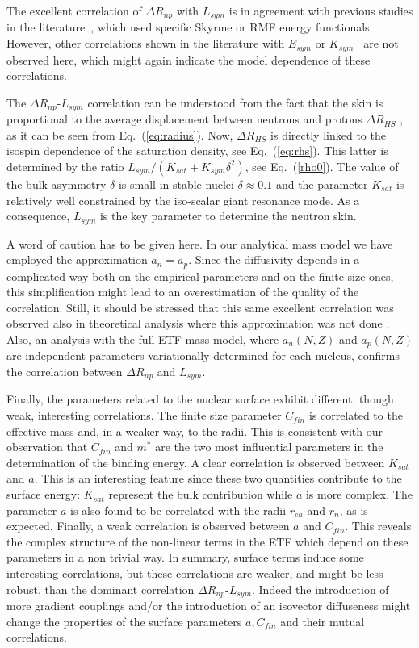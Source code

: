 \documentclass
[aps,prc,twocolumn,showpacs,showkeys,amsmath,floatfix,superscriptaddress]{revtex4}
\begin{document}
{{The excellent correlation of $\Delta R_{np}$ with $L_{sym}$ is in agreement with previous studies in the literature~\cite{Mondal,warda09,centelles10,reinhard16,centelles13}, 
which used specific Skyrme or RMF energy functionals. 
However, other correlations shown in the literature with $E_{sym}$ or $K_{sym}$~\cite{Nazarewicz14,papazoglou} are not observed here, which might again indicate the model dependence of these correlations.

The $\Delta R_{np}$-$L_{sym}$ correlation can be understood from the fact that the skin is proportional to the average displacement between neutrons and protons $\Delta R_{HS}$ \cite{meyers}, as it can be seen from Eq.~(\ref{eq:radius}). 
Now, $\Delta R_{HS}$ is directly linked to the isospin dependence of the saturation density, see Eq.~(\ref{eq:rhs}). 
This latter is determined by the ratio $L_{sym}/(K_{sat} + K_{sym}\delta^2)$, see Eq.~(\ref{rho0}).
The value of the bulk asymmetry $\delta$ is small in stable nuclei $\delta\approx 0.1$ and the parameter $K_{sat}$ is relatively well constrained by the iso-scalar giant resonance mode. 
As a consequence, $L_{sym}$ is the key parameter to determine the neutron skin. 

A word of caution has to be given here. In our analytical mass model we have employed the approximation $a_n=a_p$. Since the diffusivity depends in a complicated way both on the empirical parameters and on the finite size ones, this simplification might lead to an overestimation of the quality of the correlation. 
Still, it should be stressed that this same excellent correlation was observed also in theoretical analysis where this approximation was not done \cite{reinhard16}.  Also, an analysis with the full ETF mass model, where $a_n(N,Z)$ and $a_p(N,Z)$ are independent parameters variationally determined for each nucleus, confirms the correlation between  
$\Delta R_{np}$ and $L_{sym}$.

Finally,  the parameters related to the nuclear surface exhibit different, though weak, interesting correlations.  
The finite size parameter $C_{fin}$ is correlated to the effective mass and, in a weaker way, to the radii.
This is consistent with our observation that $C_{fin}$ and $m^*$ are the two most influential parameters in the determination of the binding energy.
A clear correlation is observed between $K_{sat}$ and $a$. 
This is an interesting feature since these two quantities contribute to the surface energy: $K_{sat}$ represent the bulk contribution while $a$ is more complex.
The parameter $a$ is also found to be correlated with the radii $r_{ch}$ and $r_n$, as is expected.
Finally, a weak correlation is observed between $a$ and $C_{fin}$.
This reveals the complex structure of the non-linear terms in the ETF which depend on these parameters in a non trivial way.
In summary, surface terms induce some interesting correlations, but these correlations are weaker, and might be less robust, than the dominant correlation $\Delta R_{np}$-$L_{sym}$. Indeed the introduction of more gradient couplings and/or the introduction of an isovector diffuseness might change the properties of the surface parameters $a, C_{fin}$ and their mutual correlations.


}}
\end{document}
